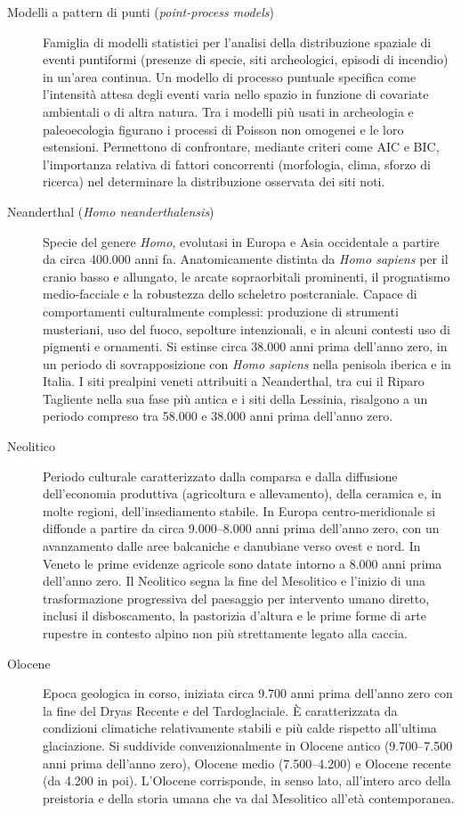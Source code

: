 \begin{description}
\item[Modelli a pattern di punti (\textit{point-process models})] Famiglia di modelli statistici per l'analisi della distribuzione spaziale di eventi puntiformi (presenze di specie, siti archeologici, episodi di incendio) in un'area continua. Un modello di processo puntuale specifica come l'intensità attesa degli eventi varia nello spazio in funzione di covariate ambientali o di altra natura. Tra i modelli più usati in archeologia e paleoecologia figurano i processi di Poisson non omogenei e le loro estensioni. Permettono di confrontare, mediante criteri come AIC e BIC, l'importanza relativa di fattori concorrenti (morfologia, clima, sforzo di ricerca) nel determinare la distribuzione osservata dei siti noti.

\item[Neanderthal (\textit{Homo neanderthalensis})] Specie del genere \textit{Homo}, evolutasi in Europa e Asia occidentale a partire da circa 400.000 anni fa. Anatomicamente distinta da \textit{Homo sapiens} per il cranio basso e allungato, le arcate sopraorbitali prominenti, il prognatismo medio-facciale e la robustezza dello scheletro postcraniale. Capace di comportamenti culturalmente complessi: produzione di strumenti musteriani, uso del fuoco, sepolture intenzionali, e in alcuni contesti uso di pigmenti e ornamenti. Si estinse circa 38.000 anni prima dell'anno zero, in un periodo di sovrapposizione con \textit{Homo sapiens} nella penisola iberica e in Italia. I siti prealpini veneti attribuiti a Neanderthal, tra cui il Riparo Tagliente nella sua fase più antica e i siti della Lessinia, risalgono a un periodo compreso tra 58.000 e 38.000 anni prima dell'anno zero.

\item[Neolitico] Periodo culturale caratterizzato dalla comparsa e dalla diffusione dell'economia produttiva (agricoltura e allevamento), della ceramica e, in molte regioni, dell'insediamento stabile. In Europa centro-meridionale si diffonde a partire da circa 9.000--8.000 anni prima dell'anno zero, con un avanzamento dalle aree balcaniche e danubiane verso ovest e nord. In Veneto le prime evidenze agricole sono datate intorno a 8.000 anni prima dell'anno zero. Il Neolitico segna la fine del Mesolitico e l'inizio di una trasformazione progressiva del paesaggio per intervento umano diretto, inclusi il disboscamento, la pastorizia d'altura e le prime forme di arte rupestre in contesto alpino non più strettamente legato alla caccia.

\item[Olocene] Epoca geologica in corso, iniziata circa 9.700 anni prima dell'anno zero con la fine del Dryas Recente e del Tardoglaciale. È caratterizzata da condizioni climatiche relativamente stabili e più calde rispetto all'ultima glaciazione. Si suddivide convenzionalmente in Olocene antico (9.700--7.500 anni prima dell'anno zero), Olocene medio (7.500--4.200) e Olocene recente (da 4.200 in poi). L'Olocene corrisponde, in senso lato, all'intero arco della preistoria e della storia umana che va dal Mesolitico all'età contemporanea.


\end{description}
